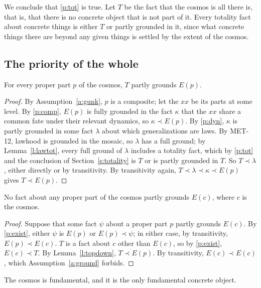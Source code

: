 \documentclass{situationist-preprint}
\begin{document}
We conclude that \ref{p:tot} is true. Let $T$ be the fact that the cosmos is all there is, that is, that there is no concrete object that is not part of it. Every totality fact about concrete things is either $T$ or partly grounded in it, since what concrete things there are beyond any given things is settled by the extent of the cosmos.

\subsection{The priority of the whole}

\begin{lemma}\label{l:topdown}
For every proper part $p$ of the cosmos, $T$ partly grounds $E(p)$.
\end{lemma}

\begin{proof}
By Assumption~\ref{a:gunk}, $p$ is a composite; let the $xx$ be its parts at some level. By \ref{p:comp}, $E(p)$ is fully grounded in the fact $\kappa$ that the $xx$ share a common fate under their relevant dynamics, so $\kappa \prec E(p)$. By \ref{p:dyn}, $\kappa$ is partly grounded in some fact $\lambda$ about which generalizations are laws. By MET-12, lawhood is grounded in the mosaic, so $\lambda$ has a full ground; by Lemma~\ref{l:lawtot}, every full ground of $\lambda$ includes a totality fact, which by \ref{p:tot} and the conclusion of Section~\ref{s:totality} is $T$ or is partly grounded in $T$. So $T \prec \lambda$, either directly or by transitivity. By transitivity again, $T \prec \lambda \prec \kappa \prec E(p)$ gives $T \prec E(p)$.
\end{proof}

\begin{lemma}\label{l:nothing}
No fact about any proper part of the cosmos partly grounds $E(c)$, where $c$ is the cosmos.
\end{lemma}

\begin{proof}
Suppose that some fact $\psi$ about a proper part $p$ partly grounds $E(c)$. By \ref{p:exist}, either $\psi$ is $E(p)$ or $E(p) \prec \psi$; in either case, by transitivity, $E(p) \prec E(c)$. $T$ is a fact about $c$ other than $E(c)$, so by \ref{p:exist}, $E(c) \prec T$. By Lemma~\ref{l:topdown}, $T \prec E(p)$. By transitivity, $E(c) \prec E(c)$, which Assumption~\ref{a:ground} forbids.
\end{proof}

\begin{theorem}\label{t:main}
The cosmos is fundamental, and it is the only fundamental concrete object.
\end{theorem}
\end{document}
